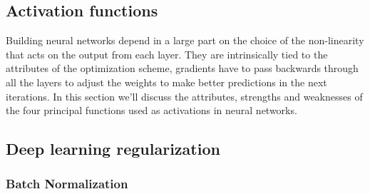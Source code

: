 \subsection{Activation functions}\label{sec:activation}

Building neural networks depend in a large part on the choice of the non-linearity that acts on the output from each layer. They are intrinsically tied to the attributes of the optimization scheme, gradients have to pass backwards through all the layers to adjust the weights to make better predictions in the next iterations. In this section we'll discuss the attributes, strengths and weaknesses of the four principal functions used as activations in neural networks. 

\subsection{Deep learning regularization}

\subsubsection{Batch Normalization}\label{sec:batchnorm}
